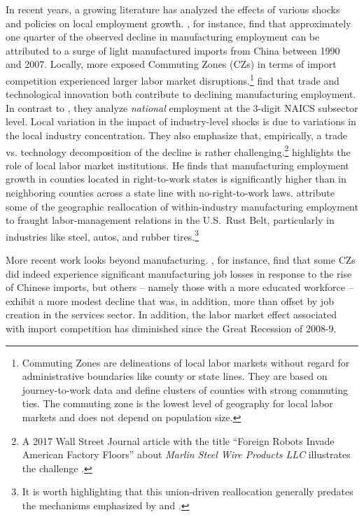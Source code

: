 \documentclass[onehalfspacing,11pt]{article}
\begin{document}
In recent years, a growing literature has analyzed the effects of various shocks and policies on local employment growth. \cite{Autor:2013}, for instance, find that approximately one quarter of the observed decline in manufacturing employment can be attributed to a surge of light manufactured imports from China between 1990 and 2007. Locally, more exposed Commuting Zones (CZs) in terms of import competition experienced larger labor market disruptions.\footnote{Commuting Zones are delineations of local labor markets without regard for administrative boundaries like county or state lines. They are based on journey-to-work data and define clusters of counties with strong commuting ties. The commuting zone is the lowest level of geography for local labor markets and does not depend on population size.} \cite{Fort:2018} find that trade and technological innovation both contribute to declining manufacturing employment. In contrast to \cite{Autor:2013}, they analyze {\it national} employment at the 3-digit NAICS subsector level. Local variation in the impact of industry-level shocks is due to variations in the local industry concentration. They also emphasize that, empirically, a trade vs. technology decomposition of the decline is rather challenging.\footnote{A 2017 Wall Street Journal article with the title ``Foreign Robots Invade American Factory Floors'' about {\it Marlin Steel Wire Products LLC} illustrates the challenge \citep{Michaels:2017}.}\cite{Holmes:1998} highlights the role of local labor market institutions. He finds that manufacturing employment growth in counties located in right-to-work states is significantly higher than in neighboring counties across a state line with no-right-to-work laws. \cite{Alder:2019b} attribute some of the geographic reallocation of within-industry manufacturing employment to fraught labor-management relations in the U.S.~Rust Belt, particularly in industries like steel, autos, and rubber tires.\footnote{It is worth highlighting that this union-driven reallocation generally predates the mechanisms emphasized by \cite{Autor:2013} and \cite{Fort:2018}.}

More recent work looks beyond manufacturing. \cite{Bloom:2019}, for instance, find that some CZs did indeed experience significant manufacturing job losses in response to the rise of Chinese imports, but others -- namely those with a more educated workforce -- exhibit a more modest decline that was, in addition, more than offset by job creation in the services sector. In addition, the labor market effect associated with import competition has diminished since the Great Recession of 2008-9.
\end{document}
